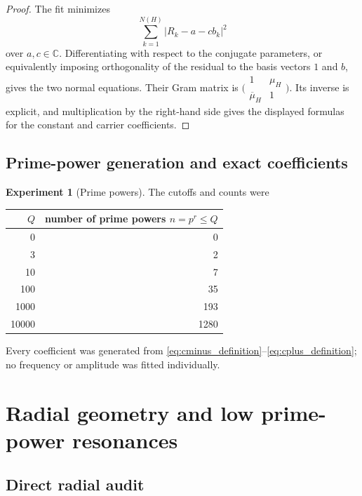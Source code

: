 \documentclass[11pt]{amsart}
\numberwithin{equation}{section}
\theoremstyle{plain}
\theoremstyle{definition}
\newtheorem{experiment}[theorem]{Experiment}
\theoremstyle{remark}
\newcommand{\1}{\mathbf{1}}
\begin{document}
\begin{proof}
The fit minimizes
\begin{equation}
\sum_{k=1}^{N(H)}|R_k-a-cb_k|^2
\label{eq:numerical_joint_objective_proof}
\end{equation}
over \(a,c\in\mathbb C\).  Differentiating with respect to the conjugate
parameters, or equivalently imposing orthogonality of the residual to the
basis vectors \(1\) and \(b\), gives the two normal equations.  Their Gram
matrix is
\(\bigl(\begin{smallmatrix}1&\mu_H\\\overline\mu_H&1\end{smallmatrix}\bigr)\).
Its inverse is explicit, and multiplication by the right-hand side gives
the displayed formulas for the constant and carrier coefficients.
\end{proof}

\subsection{Prime-power generation and exact coefficients}
\label{subsec:numerical_prime_powers}

\begin{experiment}[Prime powers]
\label{exp:numerical_prime_power_counts}
The cutoffs and counts were
\begin{center}
\begin{tabular}{rr}
\toprule
$Q$ & number of prime powers $n=p^r\leq Q$\\
\midrule
0 & 0\\
3 & 2\\
10 & 7\\
100 & 35\\
1000 & 193\\
10000 & 1280\\
\bottomrule
\end{tabular}
\end{center}
Every coefficient was generated from
\eqref{eq:cminus_definition}--\eqref{eq:cplus_definition}; no frequency or
amplitude was fitted individually.
\end{experiment}

\section{Radial geometry and low prime-power resonances}
\label{sec:numerical_radial_geometry}

\subsection{Direct radial audit}
\label{subsec:direct_radial_audit}
\end{document}
